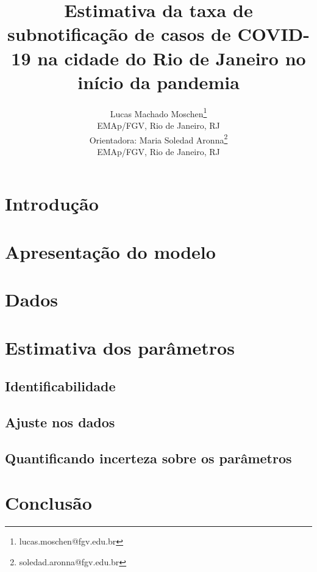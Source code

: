 \documentclass[a4,11pt]{pssbmac}
\begin{document}
\title{Estimativa da taxa de subnotificação de casos de COVID-19 na cidade do Rio de Janeiro no início da pandemia}

\author{
    {\large Lucas Machado Moschen}\thanks{lucas.moschen@fgv.edu.br} \\
    {\small EMAp/FGV, Rio de Janeiro, RJ} \\
    {\large Orientadora: Maria Soledad Aronna}\thanks{soledad.aronna@fgv.edu.br}\\
    {\small EMAp/FGV, Rio de Janeiro, RJ} \\
}

\criartitulo

\begin{abstract}



\end{abstract}

\section{Introdução}



\section{Apresentação do modelo}
\label{apresentation}



\section{Dados}
\label{data}



\section{Estimativa dos parâmetros}
\label{parameters}



\subsection{Identificabilidade}
\label{identificability}


\subsection{Ajuste nos dados}



\subsection{Quantificando incerteza sobre os parâmetros}



\section{Conclusão}
\label{conclusion}



\begin{thebibliography}{00}



\end{thebibliography}
\end{document}
